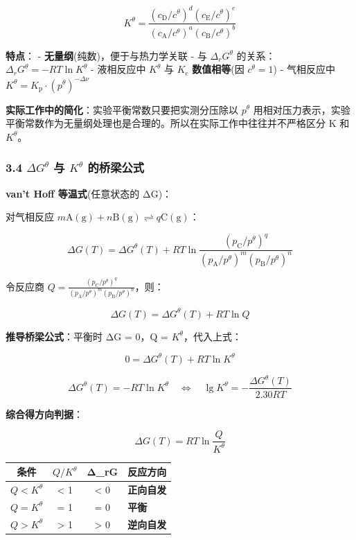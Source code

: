 \documentclass[a4paper,11pt]{ctexart}
\newcounter{none}
\newcommand{\箭}{\ensuremath{\rightarrow}}
\newcommand{\左箭}{\ensuremath{\leftarrow}}
\newcommand{\上箭}{\ensuremath{\uparrow}}
\newcommand{\下箭}{\ensuremath{\downarrow}}
\newcommand{\衡}{\ensuremath{\rightleftharpoons}}
\newcommand{\双箭}{\ensuremath{\leftrightarrow}}
\newcommand{\约等于}{\ensuremath{\approx}}
\newcommand{\小于等于}{\ensuremath{\leq}}
\newcommand{\大于等于}{\ensuremath{\geq}}
\newcommand{\不等于}{\ensuremath{\neq}}
\newcommand{\西格马}{\ensuremath{\sigma}}
\newcommand{\派}{\ensuremath{\pi}}
\begin{document}
\[
K^\theta = \frac{(c_\mathrm{D}/c^\theta)^d(c_\mathrm{E}/c^\theta)^e}{(c_\mathrm{A}/c^\theta)^a(c_\mathrm{B}/c^\theta)^b}
\]

\textbf{特点}：
- \textbf{无量纲}(纯数)，便于与热力学关联
- 与 \(\Delta_r G^\theta\) 的关系：\(\Delta_r G^\theta = -RT\ln K^\theta\)
- 液相反应中 \(K^\theta\) 与 \(K_{\mathrm c}\) \textbf{数值相等}(因 \(c^\theta = 1\))
- 气相反应中 \(K^\theta = K_{\mathrm p} \cdot (p^\theta)^{-\Delta\nu}\)

\textbf{实际工作中的简化}：实验平衡常数只要把实测分压除以 \(p^\theta\) 用相对压力表示，实验平衡常数作为无量纲处理也是合理的。所以在实际工作中往往并不严格区分 K 和 \(K^\theta\)。

\subsubsection{\texorpdfstring{3.4 \(\Delta G^\theta\) 与 \(K^\theta\) 的桥梁公式}{3.4 \textbackslash Delta G\^{}\textbackslash theta 与 K\^{}\textbackslash theta 的桥梁公式}}\label{delta-gtheta-ux4e0e-ktheta-ux7684ux6865ux6881ux516cux5f0f}

\textbf{van't Hoff 等温式}(任意状态的 ΔG)：

对气相反应 \(m\mathrm{A(g)} + n\mathrm{B(g)} \rightleftharpoons q\mathrm{C(g)}\)：

\[
\Delta G(T) = \Delta G^\theta(T) + RT\ln\frac{(p_\mathrm{C}/p^\theta)^q}{(p_\mathrm{A}/p^\theta)^m(p_\mathrm{B}/p^\theta)^n}
\]

令反应商 \(Q = \frac{(p_\mathrm{C}/p^\theta)^q}{(p_\mathrm{A}/p^\theta)^m(p_\mathrm{B}/p^\theta)^n}\)，则：

\[
\boxed{\Delta G(T) = \Delta G^\theta(T) + RT\ln Q}
\]

\textbf{推导桥梁公式}：平衡时 ΔG = 0，Q = \(K^\theta\)，代入上式：

\[
0 = \Delta G^\theta(T) + RT\ln K^\theta
\]

\[
\boxed{\Delta G^\theta(T) = -RT\ln K^\theta \quad \Longleftrightarrow \quad \lg K^\theta = -\frac{\Delta G^\theta(T)}{2.30RT}}
\]

\textbf{综合得方向判据}：

\[
\Delta G(T) = RT\ln\frac{Q}{K^\theta}
\]

{\def\LTcaptype{none} %
\begin{longtable}[]{@{}cccl@{}}
\toprule\noalign{}
条件 & \(Q/K^\theta\) & Δ\_rG & 反应方向 \\
\midrule\noalign{}
\endhead
\bottomrule\noalign{}
\endlastfoot
\(Q < K^\theta\) & \textless{} 1 & \textless{} 0 & \textbf{正向自发} \\
\(Q = K^\theta\) & = 1 & = 0 & \textbf{平衡} \\
\(Q > K^\theta\) & \textgreater{} 1 & \textgreater{} 0 & \textbf{逆向自发} \\
\end{longtable}
}
\end{document}
